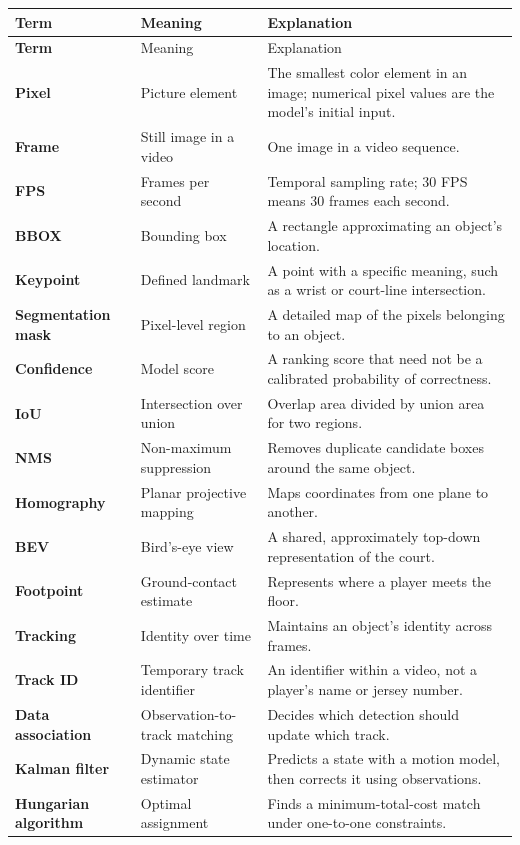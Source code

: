 \documentclass[11pt,a4paper,oneside]{report}
\begin{document}
\begin{longtable}{>{\bfseries\RaggedRight}p{3.6cm} p{4.1cm} p{8cm}}
\toprule
Term & Meaning & Explanation \\
\midrule
\endfirsthead
\toprule
Term & Meaning & Explanation \\
\midrule
\endhead
Pixel & Picture element & The smallest color element in an image; numerical pixel values are the model's initial input.\\
Frame & Still image in a video & One image in a video sequence.\\
FPS & Frames per second & Temporal sampling rate; 30 FPS means 30 frames each second.\\
BBOX & Bounding box & A rectangle approximating an object's location.\\
Keypoint & Defined landmark & A point with a specific meaning, such as a wrist or court-line intersection.\\
Segmentation mask & Pixel-level region & A detailed map of the pixels belonging to an object.\\
Confidence & Model score & A ranking score that need not be a calibrated probability of correctness.\\
IoU & Intersection over union & Overlap area divided by union area for two regions.\\
NMS & Non-maximum suppression & Removes duplicate candidate boxes around the same object.\\
Homography & Planar projective mapping & Maps coordinates from one plane to another.\\
BEV & Bird's-eye view & A shared, approximately top-down representation of the court.\\
Footpoint & Ground-contact estimate & Represents where a player meets the floor.\\
Tracking & Identity over time & Maintains an object's identity across frames.\\
Track ID & Temporary track identifier & An identifier within a video, not a player's name or jersey number.\\
Data association & Observation-to-track matching & Decides which detection should update which track.\\
Kalman filter & Dynamic state estimator & Predicts a state with a motion model, then corrects it using observations.\\
Hungarian algorithm & Optimal assignment & Finds a minimum-total-cost match under one-to-one constraints.\\

\end{longtable}
\end{document}
